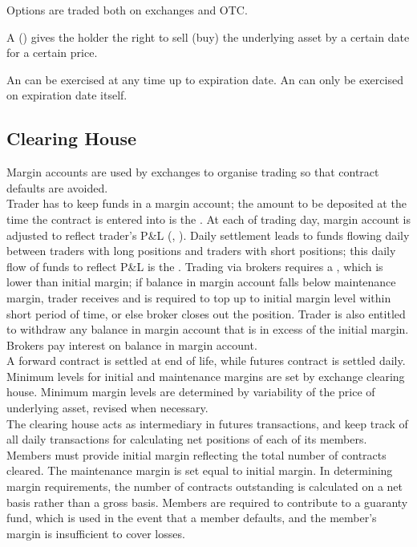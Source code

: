 \documentclass[a4paper,oneside,openany]{book}
\begin{document}
Options are traded both on exchanges and OTC.

\begin{definition} A  () gives the holder the right to sell (buy) the underlying asset by a certain date for a certain price.
\end{definition}

\begin{definition} An  can be exercised at any time up to expiration date. An  can only be exercised on expiration date itself.
\end{definition}

\subsection{Clearing House}

Margin accounts are used by exchanges to organise trading so that contract defaults are avoided. \\
Trader has to keep funds in a margin account; the amount to be deposited at the time the contract is entered into is the . At each of trading day, margin account is adjusted to reflect trader's P\&L (, ). Daily settlement leads to funds flowing daily between traders with long positions and traders with short positions; this daily flow of funds to reflect P\&L is the . Trading via brokers requires a , which is lower than initial margin; if balance in margin account falls below maintenance margin, trader receives  and is required to top up to initial margin level within short period of time, or else broker closes out the position. Trader is also entitled to withdraw any balance in margin account that is in excess of the initial margin. Brokers pay interest on balance in margin account.\\
A forward contract is settled at end of life, while futures contract is settled daily. Minimum levels for initial and maintenance margins are set by exchange clearing house. Minimum margin levels are determined by variability of the price of underlying asset, revised when necessary.\\

The clearing house acts as intermediary in futures transactions, and keep track of all daily transactions for calculating net positions of each of its members. Members must provide initial margin reflecting the total number of contracts cleared. The maintenance margin is set equal to initial margin. In determining margin requirements, the number of contracts outstanding is calculated on a net basis rather than a gross basis. Members are required to contribute to a guaranty fund, which is used in the event that a member defaults, and the member's margin is insufficient to cover losses.
\end{document}
